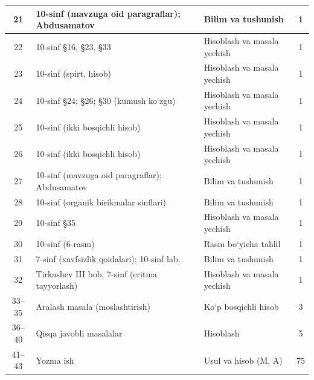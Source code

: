 \documentclass[11pt,a4paper]{article}
\begin{document}
{\begin{longtable}{|c|p{7.2cm}|p{5.4cm}|c|}
21 & 10-sinf (mavzuga oid paragraflar); Abdusamatov & Bilim va tushunish & 1\\\hline
22 & 10-sinf \S{}16, \S{}23, \S{}33 & Hisoblash va masala yechish & 1\\\hline
23 & 10-sinf (spirt, hisob) & Hisoblash va masala yechish & 1\\\hline
24 & 10-sinf \S{}24; \S{}26; \S{}30 (kumush ko`zgu) & Hisoblash va masala yechish & 1\\\hline
25 & 10-sinf (ikki bosqichli hisob) & Hisoblash va masala yechish & 1\\\hline
26 & 10-sinf (ikki bosqichli hisob) & Hisoblash va masala yechish & 1\\\hline
27 & 10-sinf (mavzuga oid paragraflar); Abdusamatov & Bilim va tushunish & 1\\\hline
28 & 10-sinf (organik birikmalar sinflari) & Bilim va tushunish & 1\\\hline
29 & 10-sinf \S{}35 & Hisoblash va masala yechish & 1\\\hline
30 & 10-sinf (6-rasm) & Rasm bo`yicha tahlil & 1\\\hline
31 & 7-sinf (xavfsizlik qoidalari); 10-sinf lab. & Bilim va tushunish & 1\\\hline
32 & Tirkashev III bob; 7-sinf (eritma tayyorlash) & Hisoblash va masala yechish & 1\\\hline
33--35 & Aralash masala (moslashtirish) & Ko`p bosqichli hisob & 3\\\hline
36--40 & Qisqa javobli masalalar & Hisoblash & 5\\\hline
41--43 & Yozma ish & Usul va hisob (M, A) & 75\\\hline
\end{longtable}}
\end{document}
